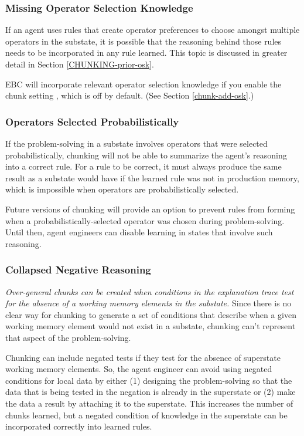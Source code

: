 \subsubsection{Missing Operator Selection Knowledge}

If an agent uses rules that create operator preferences to choose amongst multiple operators in the substate, it is possible that the reasoning behind those rules needs to be incorporated in any rule learned.  This topic is discussed in greater detail in Section \ref{CHUNKING-prior-osk}.  

EBC will incorporate relevant operator selection knowledge if you enable the chunk setting , which is off by default. (See Section \ref{chunk-add-osk}.)

\subsubsection{Operators Selected Probabilistically}

If the problem-solving in a substate involves operators that were selected probabilistically, chunking will not be able to summarize the agent's reasoning into a correct rule.  For a rule to be correct, it must always produce the same result as a substate would have if the learned rule was not in production memory, which is impossible when operators are probabilistically selected.

Future versions of chunking will provide an option to prevent rules from forming when a probabilistically-selected operator was chosen during problem-solving.  Until then, agent engineers can disable learning in states that involve such reasoning.

\subsubsection{Collapsed Negative Reasoning}

\emph{Over-general chunks can be created when conditions in the explanation trace test for the absence of a working memory elements in the substate.} Since there is no clear way for chunking to generate a set of conditions that describe when a given working memory element would not exist in a substate, chunking can't represent that aspect of the problem-solving. 

Chunking can include negated tests if they test for the absence of superstate working memory elements.  So, the agent engineer can avoid using negated conditions for local data by either (1) designing the problem-solving so that the data that is being tested in the negation is already in the superstate or (2) make the data a result by attaching it to the superstate. This increases the number of chunks learned, but a negated condition of knowledge in the superstate can be incorporated correctly into learned rules.

